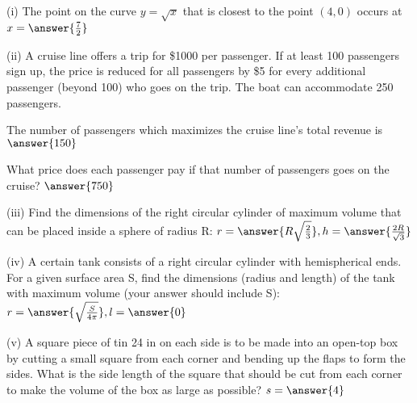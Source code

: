 \documentclass{ximera}
\begin{document}
\begin{exercise}
(i) The point on the curve $y=\sqrt{x}$ that is closest to the point $(4,0)$ occurs at $x=\answer{\frac{7}{2}}$

(ii) A cruise line offers a trip for \$1000 per passenger. If at least 100 passengers sign up, the price is reduced for all passengers by \$5 for every additional passenger (beyond 100) who goes on the trip.  The boat can accommodate 250 passengers.

The number of passengers which maximizes the cruise line's total revenue is $\answer{150}$

What price does each passenger pay if that number of passengers goes on the cruise? $\answer{750}$

(iii) Find the dimensions of the right circular cylinder of maximum volume that can be placed inside a sphere of radius R: $r=\answer{R\sqrt{\frac{2}{3}}},  h=\answer{\frac{2R}{\sqrt{3}}}$

(iv) A certain tank consists of a right circular cylinder with hemispherical ends. For a given surface area S, find the dimensions (radius and length) of the tank with maximum volume (your answer should include S): $r=\answer{\sqrt{\frac{S}{4\pi}}}, l=\answer{0}$

(v) A square piece of tin 24 in on each side is to be made into an open-top box by cutting a small square from each corner and bending up the flaps to form the sides.  What is the side length of the square that should be cut from each corner to make the volume of the box as large as possible? $s=\answer{4}$
\end{exercise}
\end{document}
